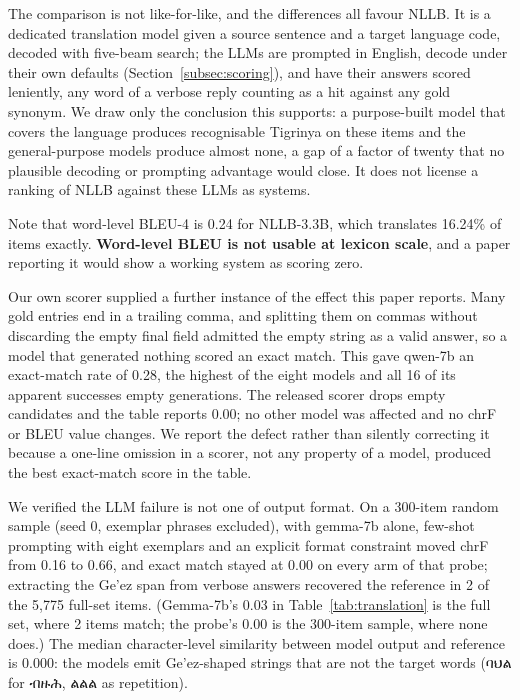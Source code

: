 \documentclass[11pt]{article}
\newcommand{\ti}[1]{{\geezfont #1}}
\newcommand{\ti}[1]{\texttt{[ge'ez]}}
\begin{document}
The comparison is not like-for-like, and the differences all favour NLLB.
It is a dedicated translation model given a source sentence and a target
language code, decoded with five-beam search; the LLMs are prompted in
English, decode under their own defaults (Section~\ref{subsec:scoring}), and
have their answers scored leniently, any word of a verbose reply counting as
a hit against any gold synonym. We draw only the conclusion this supports:
a purpose-built model that covers the language produces recognisable
Tigrinya on these items and the general-purpose models produce almost none,
a gap of a factor of twenty that no plausible decoding or prompting
advantage would close. It does not license a ranking of NLLB against these
LLMs as systems.

Note that word-level BLEU-4 is 0.24 for NLLB-3.3B, which translates 16.24\% of
items exactly. \textbf{Word-level BLEU is not usable at lexicon scale}, and a
paper reporting it would show a working system as scoring zero.

Our own scorer supplied a further instance of the effect this paper reports.
Many gold entries end in a trailing comma, and splitting them on commas
without discarding the empty final field admitted the empty string as a valid
answer, so a model that generated nothing scored an exact match. This gave
qwen-7b an exact-match rate of 0.28, the highest of the eight models and all
16 of its apparent successes empty generations. The released scorer drops
empty candidates and the table reports 0.00; no other model was affected and
no chrF or BLEU value changes. We report the defect rather than silently
correcting it because a one-line omission in a scorer, not any property of a
model, produced the best exact-match score in the table.

We verified the LLM failure is not one of output format. On a 300-item
random sample (seed 0, exemplar phrases excluded), with gemma-7b alone,
few-shot prompting with eight exemplars
and an explicit format constraint moved chrF from 0.16 to 0.66, and exact
match stayed at 0.00 on every arm of that probe; extracting the Ge'ez span
from verbose answers recovered the reference in 2 of the 5,775 full-set
items. (Gemma-7b's 0.03 in Table~\ref{tab:translation} is the full set,
where 2 items match; the probe's 0.00 is the 300-item sample, where none
does.) The
median character-level similarity between model output and reference is 0.000:
the models emit Ge'ez-shaped strings that are not the target words
(\ti{ባህል} for \ti{ብዙሕ}, \ti{ልልል} as repetition).
\end{document}
